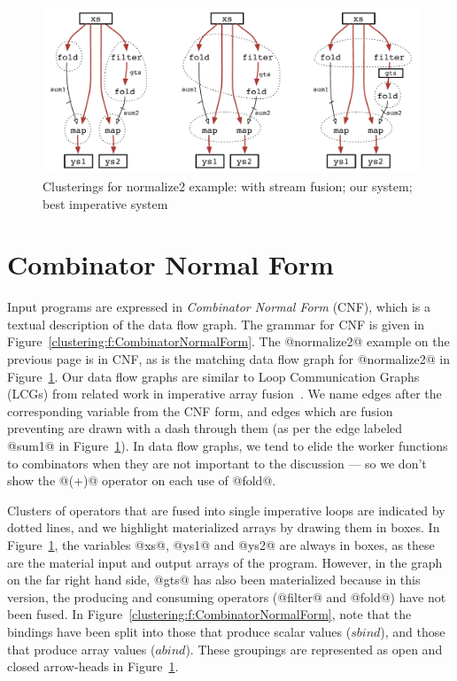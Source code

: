 
\begin{figure}[ht!]
\begin{center}
\includegraphics[scale=0.5]{copy/03-body/clustering/figures/ex1-compare.pdf}
\end{center}
\caption{Clusterings for normalize2 example: with stream fusion; our system; best imperative system}
\label{clustering:f:normalize2-clusterings}
\end{figure}


\chapter{Combinator Normal Form}
\label{clustering:s:CombinatorNormalForm}
Input programs are expressed in \emph{Combinator Normal Form} (CNF), which is a textual description of the data flow graph. The grammar for CNF is given in Figure~\ref{clustering:f:CombinatorNormalForm}. The @normalize2@  example on the previous page is in CNF,  as is the matching data flow graph for @normalize2@ in Figure~\ref{clustering:f:normalize2-clusterings}. Our data flow graphs are similar to Loop Communication Graphs (LCGs) from related work in imperative array fusion~\cite{gao1993collective}. We name edges after the corresponding variable from the CNF form, and edges which are fusion preventing are drawn with a dash through them (as per the edge labeled @sum1@ in Figure~\ref{clustering:f:normalize2-clusterings}). In data flow graphs, we tend to elide the worker functions to combinators when they are not important to the discussion --- so we don't show the @(+)@ operator on each use of @fold@.

Clusters of operators that are fused into single imperative loops are indicated by dotted lines, and we highlight materialized arrays by drawing them in boxes. In Figure~\ref{clustering:f:normalize2-clusterings}, the variables @xs@, @ys1@ and @ys2@ are always in boxes, as these are the material input and output arrays of the program. However, in the graph on the far right hand side, @gts@ has also been materialized because in this version, the producing and consuming operators (@filter@ and @fold@) have not been fused. In Figure~\ref{clustering:f:CombinatorNormalForm}, note that the bindings have been split into those that produce scalar values ($sbind$), and those that produce array values ($abind$). These groupings are represented as open and closed arrow-heads in Figure~\ref{clustering:f:normalize2-clusterings}.

